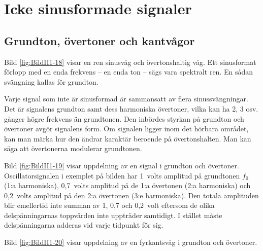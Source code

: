 \section{Icke sinusformade signaler}

\subsection{Grundton, övertoner och kant\-vågor}
\label{övertoner}


Bild \ref{fig:BildII1-18} visar en ren sinusvåg och övertonshaltig våg.
Ett sinusformat förlopp med en enda frekvens -- en enda ton -- sägs vara
spektralt ren.
En sådan svängning kallas för grundton.

Varje signal som inte är sinusformad är sammansatt av flera sinussvängningar.
Det är signalens grundton samt dess harmoniska övertoner, vilka kan ha 2, 3
osv. gånger högre frekvens än grundtonen.
Den inbördes styrkan på grundton och övertoner avgör signalens form.
Om signalen ligger inom det hörbara området, kan man märka hur den ändrar
karaktär beroende på övertonshalten.
Man kan säga att övertonerna modulerar grundtonen.


Bild \ref{fig:BildII1-19} visar uppdelning av en signal i grundton och
övertoner.
Oscillatorsignalen i exemplet på bilden har 1~volts amplitud på grundtonen
\(f_0\) (1:a harmoniska), 0,7~volts amplitud på de 1:a övertonen
(2:a harmoniska) och 0,2~volts amplitud på den 2:a övertonen (3:e harmoniska).
Den totala amplituden blir emellertid inte summan av 1, 0,7 och 0,2~volt
eftersom de olika delspänningarnas toppvärden inte uppträder samtidigt.
I stället måste delspänningarna adderas vid varje tidpunkt för sig.


Bild \ref{fig:BildII1-20} visar uppdelning av en fyrkantsvåg i grundton och
övertoner.


